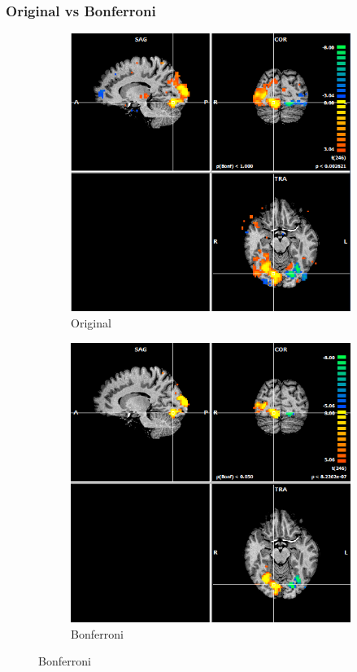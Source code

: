\documentclass{beamer}
\begin{document}
\begin{frame}
\frametitle{Original vs Bonferroni}
\begin{figure}
    \centering
    \begin{subfigure}[b]{0.48\textwidth}
        \includegraphics[width=\textwidth]{Images/Brainvoyager83187129.png}
	\caption{Original}
    \end{subfigure}
    \begin{subfigure}[b]{0.48\textwidth}
        \includegraphics[width=\textwidth]{Images/Brainvoyager-Bonferroni83187129.png}
	\caption{Bonferroni}
    \end{subfigure}
\end{figure}
\end{frame}
\end{document}
